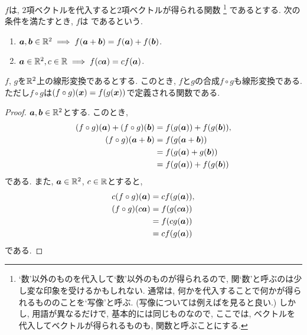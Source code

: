 \begin{definition}
  \label{def:lintransform}
  $f$は,
  $2$項ベクトルを代入すると$2$項ベクトルが得られる関数%
\footnote{`数'以外のものを代入して`数'以外のものが得られるので, 関`数'と呼ぶのは少し変な印象を受けるかもしれない.  通常は, 何かを代入することで何かが得られるもののことを`写像'と呼ぶ.  (写像については例えば\cite[トレーニング26]{978-4-535-78682-0}を見ると良い.) しかし, 用語が異なるだけで, 基本的には同じものなので, ここでは, ベクトルを代入してベクトルが得られるものも, 関数と呼ぶことにする.}
  であるとする.
  次の条件を満たすとき, $f$は
  であるという.
  \begin{enumerate}
  \item $\boldsymbol{a},\boldsymbol{b}\in\mathbb{R}^2\implies f(\boldsymbol{a}+\boldsymbol{b})=f(\boldsymbol{a})+f(\boldsymbol{b})$.
  \item $\boldsymbol{a}\in\mathbb{R}^2,c\in \mathbb{R} \implies f(c\boldsymbol{a})=cf(\boldsymbol{a})$.
  \end{enumerate}
\end{definition}
\begin{prop}
  $f$, $g$を$\mathbb{R}^2$上の線形変換であるとする.
  このとき, $f$と$g$の合成$f\circ g$も線形変換である.
  ただし$f\circ g$は$(f\circ g)(\boldsymbol{x})=f(g(\boldsymbol{x}))$で定義される関数である.
\end{prop}
\begin{proof}
  $\boldsymbol{a},\boldsymbol{b}\in\mathbb{R}^2$とする.
  このとき,
  \begin{align*}
    (f\circ g)(\boldsymbol{a})+(f\circ g)(\boldsymbol{b})
    &=f(g(\boldsymbol{a}))+f(g(\boldsymbol{b})),\\
    (f\circ g)(\boldsymbol{a}+\boldsymbol{b})&=f(g(\boldsymbol{a}+\boldsymbol{b}))\\
    &=f(g(\boldsymbol{a})+g(\boldsymbol{b}))\\
    &=f(g(\boldsymbol{a}))+f(g(\boldsymbol{b}))
  \end{align*}
  である.
  また, $\boldsymbol{a}\in\mathbb{R}^2$, $c\in \mathbb{R}$とすると,
  \begin{align*}
    c(f\circ g)(\boldsymbol{a})
    &=cf(g(\boldsymbol{a})),\\
    (f\circ g)(c\boldsymbol{a})
    &=f(g(c\boldsymbol{a}))\\
    &=f(cg(\boldsymbol{a}))\\
    &=cf(g(\boldsymbol{a}))
  \end{align*}
  である.
\end{proof}
